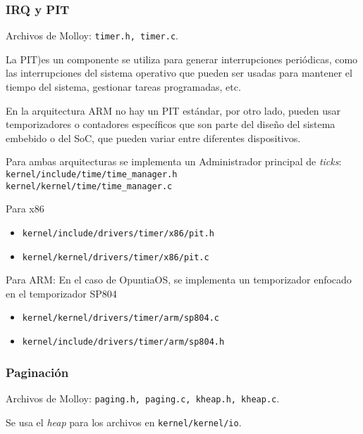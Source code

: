 	
		
	
	
	\subsubsection{IRQ y PIT}
		Archivos de Molloy: \texttt{timer.h, timer.c}.
		
		La PIT)es un componente se utiliza para generar interrupciones periódicas, como las interrupciones del sistema operativo que pueden ser usadas para mantener el tiempo del sistema, gestionar tareas programadas, etc.
		
		En la arquitectura ARM no hay un PIT estándar, por otro lado, pueden usar temporizadores o contadores específicos que son parte del diseño del sistema embebido o del SoC, que pueden variar entre diferentes dispositivos.
		
		Para ambas arquitecturas se implementa un Administrador principal de \textit{ticks}:\\
		\texttt{kernel/include/time/time\_manager.h} \\
		\texttt{kernel/kernel/time/time\_manager.c}
		
		Para x86
		\begin{itemize} \setlength\itemsep{0pt}
			\item \texttt{kernel/include/drivers/timer/x86/pit.h}
			\item \texttt{kernel/kernel/drivers/timer/x86/pit.c}
			
		\end{itemize}
	
		Para ARM:
		En el caso de OpuntiaOS, se implementa un temporizador enfocado en el temporizador SP804
		\begin{itemize} \setlength\itemsep{0pt}
			\item \texttt{kernel/kernel/drivers/timer/arm/sp804.c}
			\item \texttt{kernel/include/drivers/timer/arm/sp804.h}
		\end{itemize}
		
	
		

	
	\subsubsection{Paginación}
		Archivos de Molloy: \texttt{paging.h, paging.c, kheap.h, kheap.c}.
		
		
		Se usa el \textit{heap} para los archivos en \texttt{kernel/kernel/io}.
		
